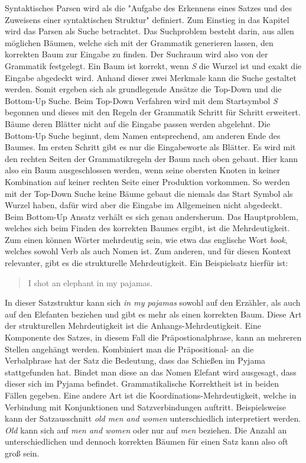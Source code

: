 Syntaktisches Parsen wird als die "Aufgabe des Erkennens eines Satzes und des Zuweisens einer syntaktischen Struktur" definiert. %
Zum Einstieg in das Kapitel wird das Parsen als Suche betrachtet. Das Suchproblem besteht darin, aus allen möglichen Bäumen, welche sich mit der Grammatik generieren lassen, den korrekten Baum zur Eingabe zu finden. Der Suchraum wird also von der Grammatik festgelegt. Ein Baum ist korrekt, wenn \textit{S} die Wurzel ist und exakt die Eingabe abgedeckt wird. Anhand dieser zwei Merkmale kann die Suche gestaltet werden. Somit ergeben sich als grundlegende Ansätze die Top-Down und die Bottom-Up Suche. Beim Top-Down Verfahren wird mit dem Startsymbol \textit{S} begonnen und dieses mit den Regeln der Grammatik Schritt für Schritt erweitert. Bäume deren Blätter nicht auf die Eingabe passen werden abgelehnt. Die Bottom-Up Suche beginnt, dem Namen entsprechend, am anderen Ende des Baumes. Im ersten Schritt gibt es nur die Eingabeworte als Blätter. Es wird mit den rechten Seiten der Grammatikregeln der Baum nach oben gebaut. Hier kann also ein Baum ausgeschlossen werden, wenn seine obersten Knoten in keiner Kombination auf keiner rechten Seite einer Produktion vorkommen. %
So werden mit der Top-Down Suche keine Bäume gebaut die niemals das Start Symbol als Wurzel haben, dafür wird aber die Eingabe im Allgemeinen nicht abgedeckt. Beim Bottom-Up Ansatz verhält es sich genau andersherum. 
Das Hauptproblem, welches sich beim Finden des korrekten Baumes ergibt, ist die Mehrdeutigkeit. Zum einen können Wörter mehrdeutig sein, wie etwa das englische Wort \textit{book}, welches sowohl Verb als auch Nomen ist. Zum anderen, und für diesen Kontext relevanter, gibt es die strukturelle Mehrdeutigkeit. Ein Beispielsatz hierfür ist: 
\begin{quote}
I shot an elephant in my pajamas.
\end{quote}
In dieser Satzstruktur kann sich \textit{in my pajamas} sowohl auf den Erzähler, als auch auf den Elefanten beziehen und gibt es mehr als einen korrekten Baum. %
Diese Art der strukturellen Mehrdeutigkeit ist die Anhangs-Mehrdeutigkeit. Eine Komponente des Satzes, in diesem Fall die Präpostionalphrase, kann an mehreren Stellen angehängt werden. Kombiniert man die Präpositional- an die Verbalphrase hat der Satz die Bedeutung, dass das Schießen im Pyjama stattgefunden hat. Bindet man diese an das Nomen Elefant wird ausgesagt, dass dieser sich im Pyjama befindet. Grammatikalische Korrektheit ist in beiden Fällen gegeben. Eine andere Art ist die Koordinations-Mehrdeutigkeit, welche in Verbindung mit Konjunktionen und Satzverbindungen auftritt. Beispielsweise kann der Satzausschnitt \textit{old men and women} unterschiedlich interpretiert werden. \textit{Old} kann sich auf \textit{men and women} oder nur auf \textit{men} beziehen. Die Anzahl an unterschiedlichen und dennoch korrekten Bäumen für einen Satz kann also oft groß sein. %
